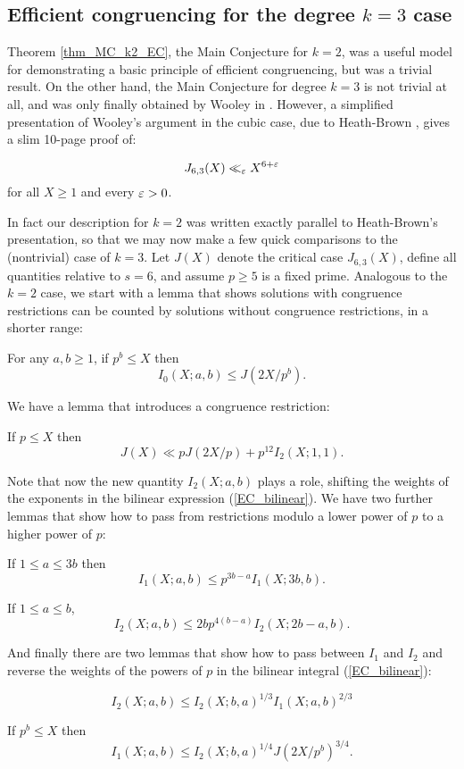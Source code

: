 \documentclass[brochure,english,12pt]{bourbaki}%
\begin{document}
\subsection{Efficient congruencing for the degree $k=3$ case}\label{sec_k3_EC}
Theorem \ref{thm_MC_k2_EC}, the Main Conjecture for $k=2$, was a useful model for demonstrating a basic principle of efficient congruencing, but was a trivial result. On the other hand, the Main Conjecture for degree $k=3$ is not trivial at all, and was only finally obtained by Wooley in \cite{Woo16c}. However, a simplified presentation of Wooley's argument in the cubic case, due to Heath-Brown \cite{HB15x}, gives a slim 10-page proof of:
\begin{theo}[Main Conjecture for $k=3$]\label{thm_MC_k3_EC}
\[ J_{6,3}(X) \ll_\varepsilon X^{6+\varepsilon} \]
for all $X \geq 1$ and every $\varepsilon>0$.
\end{theo}
In fact  our description for $k=2$ was written exactly parallel to Heath-Brown's presentation, so that we may now make a few quick comparisons to the (nontrivial) case of $k=3$. Let $J(X)$ denote the critical case $J_{6,3}(X)$, define all quantities relative to $s=6$, and assume $p \geq 5$ is a fixed prime. Analogous to the $k=2$ case, we start with a lemma that shows solutions with congruence restrictions can be counted by solutions without congruence restrictions, in a shorter range:
\begin{lemm}\label{k3_EC_lemma1}
For any $a,b \geq 1$, if $p^b \leq X$ then 
\[ I_0(X;a,b) \leq J(2X/p^b).\]
\end{lemm}
We have a lemma that introduces a congruence restriction:
\begin{lemm}\label{k3_EC_lemma2}
If $p\leq X$ then
\[J(X) \ll p J(2X/p) + p^{12} I_2(X;1,1).\]
\end{lemm}
Note that now the new quantity $I_2(X;a,b)$ plays a role, shifting the weights of the exponents in the bilinear expression (\ref{EC_bilinear}).
We have two further lemmas that show how to pass from restrictions modulo a lower power of $p$ to a higher power of $p$:
\begin{lemm}\label{k3_EC_lemma5}
If $1 \leq a \leq 3b$  then 
\[ I_1(X;a,b) \leq p^{3b-a} I_1(X;3b,b).\]
\end{lemm}
\begin{lemm}\label{k3_EC_lemma6}
If $1 \leq a \leq b$, 
\[ I_2(X;a,b) \leq 2b p^{4(b-a)} I_2(X;2b-a,b).\]
\end{lemm}
And finally there are two lemmas that show how to pass between $I_1$ and $I_2$ and reverse the weights of the powers of $p$ in the bilinear integral (\ref{EC_bilinear}):
\begin{lemm}\label{k3_EC_lemma3}
\[I_2(X;a,b) \leq I_2(X;b,a)^{1/3}I_1(X;a,b)^{2/3}\]
\end{lemm}
\begin{lemm}\label{k3_EC_lemma4}
If $p^b \leq X$ then 
\[ I_1(X;a,b) \leq I_2(X;b,a)^{1/4} J(2X/p^b)^{3/4}.\]
\end{lemm}
\end{document}

